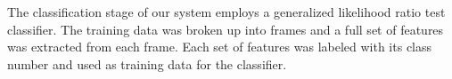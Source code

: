 The classification stage of our system employs a generalized likelihood ratio test 
classifier. The training data was broken up into frames and a full set of features
was extracted from each frame. Each set of features was labeled with its class number
and used as training data for the classifier.

